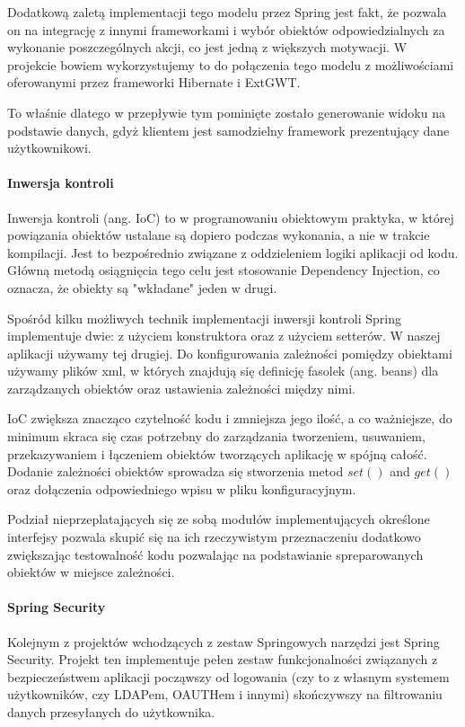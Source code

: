 \documentclass[licencjacka]{pracamgr}
\begin{document}
Dodatkową zaletą implementacji tego modelu przez Spring jest fakt, że pozwala on na integrację z innymi frameworkami i wybór obiektów odpowiedzialnych za wykonanie poszczególnych akcji, co jest jedną z większych motywacji. W projekcie bowiem wykorzystujemy to do połączenia tego modelu z możliwościami oferowanymi przez frameworki Hibernate i ExtGWT.

To właśnie dlatego w przepływie tym pominięte zostało generowanie widoku na podstawie danych, gdyż klientem jest samodzielny framework prezentujący dane użytkownikowi.

\paragraph{Inwersja kontroli}
Inwersja kontroli (ang. IoC) to w programowaniu obiektowym praktyka, w której powiązania obiektów ustalane są dopiero podczas wykonania, a nie w trakcie kompilacji. Jest to bezpośrednio związane z oddzieleniem logiki aplikacji od kodu. Główną metodą osiągnięcia tego celu jest stosowanie Dependency Injection, co oznacza, że obiekty są "wkładane" jeden w drugi.

Spośród kilku możliwych technik implementacji inwersji kontroli Spring implementuje dwie: z użyciem konstruktora oraz z użyciem setterów. W naszej aplikacji używamy tej drugiej. Do konfigurowania zależności pomiędzy obiektami używamy plików xml, w których znajdują się definicję fasolek (ang. beans) dla zarządzanych obiektów oraz ustawienia zależności między nimi.

IoC zwiększa znacząco czytelność kodu i zmniejsza jego ilość, a co ważniejsze, do minimum skraca się czas potrzebny do zarządzania tworzeniem, usuwaniem, przekazywaniem i łączeniem obiektów tworzących aplikację w spójną całość. Dodanie zależności obiektów sprowadza się stworzenia metod $set()$ and $get()$ oraz dołączenia odpowiedniego wpisu w pliku konfiguracyjnym.

Podział nieprzeplatających się ze sobą modułów implementujących określone interfejsy pozwala skupić się na ich rzeczywistym przeznaczeniu dodatkowo zwiększając testowalność kodu pozwalając na podstawianie spreparowanych obiektów w miejsce zależności.

\paragraph{Spring Security}
Kolejnym z projektów wchodzących z zestaw Springowych narzędzi jest Spring Security. Projekt ten implementuje pełen zestaw funkcjonalności związanych z bezpieczeństwem aplikacji począwszy od logowania (czy to z własnym systemem użytkowników, czy LDAPem, OAUTHem i innymi) skończywszy na filtrowaniu danych przesyłanych do użytkownika.
\end{document}
